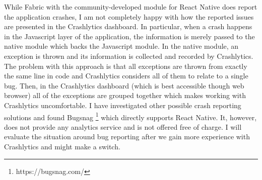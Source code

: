 While Fabric with the community-developed module for React Native does report the application crashes, I am not completely happy with how the reported issues are presented in the Crashlytics dashboard. In particular, when a crash happens in the Javascript layer of the application, the information is merely passed to the native module which backs the Javascript module. In the native module, an exception is thrown and its information is collected and recorded by Crashlytics. The problem with this approach is that all exceptions are thrown from exactly the same line in code and Crashlytics considers all of them to relate to a single bug. Then, in the Crashlytics dashboard (which is best accessible though web browser) all of the exceptions are grouped together which makes working with Crashlytics uncomfortable. I have investigated other possible crash reporting solutions and found Bugsnag \footnote{https://bugsnag.com/} which directly supports React Native. It, however, does not provide any analytics service and is not offered free of charge. I will evaluate the situation around bug reporting after we gain more experience with Crashlytics and might make a switch.